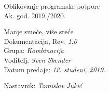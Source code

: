 \documentclass[12pt]{report}
\begin{document}
	
	\begin{titlepage}
		\begin{center}
			\LARGE Oblikovanje programske potpore\\
			\large Ak. god. 2019./2020.\\
			
			
			\huge Manje smeće, više sreće\\
			\Large Dokumentacija, Rev. \textit{1.0}\\
			
			\normalsize
			Grupa: \textit{Kombinacija}\\
			Voditelj: \textit{Sven Skender}\\
			
			
			Datum predaje: \textit{12. studeni, 2019.}\\
			
			
			Nastavnik: \textit{Tomislav Jukić}\\
		
		\end{center}
	
	\end{titlepage}
	
	\tableofcontents

	
	
	
	
	
	
	
	
	\begingroup
	\renewcommand*\listfigurename{Indeks slika i dijagrama}
	\renewcommand*\listtablename{Indeks tablica}
	\let\clearpage\relax
	\listoffigures
	\vspace{10mm}
	\listoftables
	\endgroup

	\eject 
		
	
\end{document}
